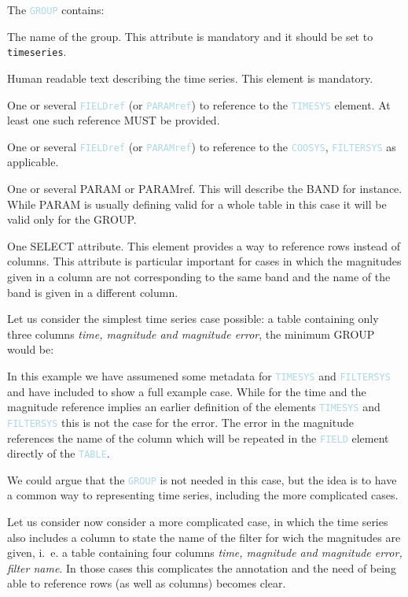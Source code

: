 \documentclass[11pt,a4paper]{ivoa}
\newcommand\elem[1]{\textcolor{LightBlue}{{\tt#1}}}
\begin{document}
The \elem{GROUP} contains:
\begin{description}
     \item[\elem{name}] The name of the group. This attribute is mandatory and it should be set to \verb|timeseries|. 
     \item[\elem{DESCRIPTION}] Human readable text describing the time series. This element is mandatory. 
     \item[\elem{FIELDref}] One or several \elem{FIELDref} (or \elem{PARAMref}) to reference to the \elem{TIMESYS} element. At least one such reference MUST be provided.
     \item[\elem{FIELDref}] One or several \elem{FIELDref} (or \elem{PARAMref}) to reference to the \elem{COOSYS}, \elem{FILTERSYS} as applicable. 
     \item One or several PARAM or PARAMref. This will describe the BAND for instance. While PARAM is usually defining valid for a whole table in this case it will be valid only for the GROUP.  
     \item[\elem{SELECT}] One SELECT attribute. This element provides a way to reference rows instead of columns. This attribute is particular important for cases in which the magnitudes given in a column are not corresponding to the same band and the name of the band is given in a different column. 
\end{description}

Let us consider the simplest time series case possible: a table containing only three columns \emph{time, magnitude and magnitude error}, the minimum GROUP would be:

\begingroup

\endgroup

In this example we have assumened some metadata for \elem{TIMESYS} and \elem{FILTERSYS} and have included to show a full example case. While for the time and the magnitude reference implies an earlier definition of the elements \elem{TIMESYS} and \elem{FILTERSYS} this is not the case for the error. The error in the magnitude references the name of the column which will be repeated in the \elem{FIELD} element directly of the \elem{TABLE}.

We could argue that the \elem{GROUP} is not needed in this case, but the idea is to have a common way to representing time series, including the more complicated cases. 

\newpage 
Let us consider now consider a more complicated case, in which the time series also includes a column to state the name of the filter for wich the magnitudes are given, i.~e. a table containing four columns \emph{time, magnitude and magnitude error, filter name}. In those cases this complicates the annotation and the need of being able to reference rows (as well as columns) becomes clear.
\end{document}
